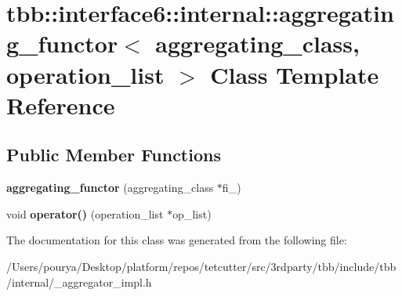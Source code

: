\hypertarget{classtbb_1_1interface6_1_1internal_1_1aggregating__functor}{}\section{tbb\+:\+:interface6\+:\+:internal\+:\+:aggregating\+\_\+functor$<$ aggregating\+\_\+class, operation\+\_\+list $>$ Class Template Reference}
\label{classtbb_1_1interface6_1_1internal_1_1aggregating__functor}
\subsection*{Public Member Functions}
\begin{DoxyCompactItemize}
\item 
\hypertarget{classtbb_1_1interface6_1_1internal_1_1aggregating__functor_a12a02c0b2dc3ca27e8cc14f5871ec3c2}{}{\bfseries aggregating\+\_\+functor} (aggregating\+\_\+class $\ast$fi\+\_\+)\label{classtbb_1_1interface6_1_1internal_1_1aggregating__functor_a12a02c0b2dc3ca27e8cc14f5871ec3c2}

\item 
\hypertarget{classtbb_1_1interface6_1_1internal_1_1aggregating__functor_a08f9863af41c8552c034c585667c3ec6}{}void {\bfseries operator()} (operation\+\_\+list $\ast$op\+\_\+list)\label{classtbb_1_1interface6_1_1internal_1_1aggregating__functor_a08f9863af41c8552c034c585667c3ec6}

\end{DoxyCompactItemize}


The documentation for this class was generated from the following file\+:\begin{DoxyCompactItemize}
\item 
/\+Users/pourya/\+Desktop/platform/repos/tetcutter/src/3rdparty/tbb/include/tbb/internal/\+\_\+aggregator\+\_\+impl.\+h\end{DoxyCompactItemize}
